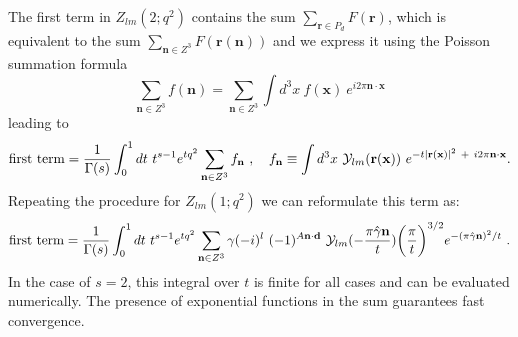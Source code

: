 \documentclass[a4paper,12pt]{book}
\begin{document}
The first term in $Z_{lm}(2;q^2)$ contains the sum $\sum_{\mathbf{r} \in P_d}F(\mathbf{r})$, which is equivalent to the sum $\sum_{\mathbf{n}\in Z^3} F(\mathbf{r}(\mathbf{n}))$ and we express  it  using the Poisson summation formula  
\begin{equation}
\sum_{\mathbf{n}\in Z^3} f(\mathbf{n})=\sum_{\mathbf{n}\in Z^3} \int d^3x~f(\mathbf{x})~e^{i2\pi \mathbf{n}\cdot \mathbf{x}}
\end{equation}
leading to
\begin{equation}
\mathrm{first\ term}=\frac{1}{\Gamma(s)} \int _0^1 dt~t^{s-1} e^{tq^2} \sum_{\mathbf{n}\in Z^3} f_{\mathbf{n}}~,\quad f_{\mathbf{n}}\equiv \int d^3x~{\cal Y}_{lm}(\mathbf{r}(\mathbf{x}))~ e^{-t|\mathbf{r}(\mathbf{x})|^2~+~i2\pi \mathbf{n}\cdot \mathbf{x}}.
\end{equation}
Repeating the procedure for $Z_{lm}(1;q^2)$ we can reformulate this term as:
\begin{align}
\mathrm{first\ term}=\frac{1}{\Gamma(s)} \int _0^1 dt~t^{s-1} e^{tq^2} \sum_{\mathbf{n}\in Z^3} \gamma (-i)^l~ (-1)^{A\mathbf{n\cdot d}} ~ {\cal Y}_{lm}(-\frac{\pi\hat \gamma \mathbf{n}}{t}) \biggl(\frac{\pi}{t}\biggr)^{3/2}  e^{-(\pi \hat \gamma \mathbf{n})^2/t}~.
\end{align}
In the case of $s=2$, this integral over $t$ is finite for all cases and can be evaluated numerically. The presence of exponential functions in the sum guarantees fast convergence.



\end{document}
